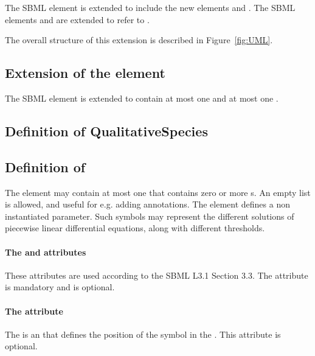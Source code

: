The SBML element  is extended to include the new elements  and . The SBML elements  and  are extended to refer to .

The overall structure of this extension is described in Figure~\ref{fig:UML}.

\bigskip
\subsection*{Extension of the  element} %
\label{sub:model}
The SBML element  is extended to contain at most one  and at most one .

\subsection*{Definition of \textsf{\textbf{\hypertarget{QualitativeSpecies}{QualitativeSpecies}}}} %


\bigskip
\subsection*{Definition of } %
The  element may contain at most one  that contains zero or more s. An empty list is allowed, and useful for e.g. adding annotations.
The  element defines a non instantiated parameter. Such symbols may represent the different solutions of piecewise linear differential equations, along with different thresholds.

\paragraph{The  and  attributes}
These attributes are used according to the SBML L3.1 Section 3.3. The attribute  is mandatory and  is optional. 

\paragraph{The  attribute}
The  is an  that defines the position of the symbol in the . This attribute is optional.

